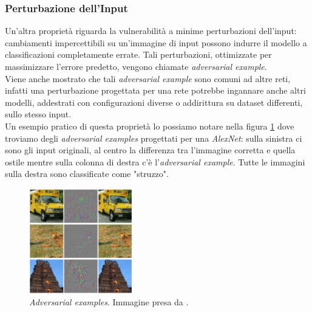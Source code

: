 \subsubsection{Perturbazione dell'Input}
Un'altra propriet\`a riguarda la vulnerabilit\`a a minime perturbazioni dell'input: cambiamenti impercettibili su un'immagine di input possono indurre il modello a classificazioni completamente errate. Tali perturbazioni, ottimizzate per massimizzare l'errore predetto, vengono chiamate \emph{adversarial example}.\\
Viene anche mostrato che tali \emph{adversarial example} sono comuni ad altre reti, infatti una perturbazione progettata per una rete potrebbe ingannare anche altri modelli, addestrati con configurazioni diverse o addirittura su dataset differenti, sullo stesso input.\\
Un esempio pratico di questa propriet\`a lo possiamo notare nella figura \ref{fig:intriguing_adv_example} dove troviamo degli \emph{adversarial examples} progettati per una \emph{AlexNet}: sulla sinistra ci sono gli input originali, al centro la differenza tra l'immagine corretta e quella ostile mentre sulla colonna di destra c'\`e l'\emph{adversarial example}. Tutte le immagini sulla destra sono classificate come "struzzo".

\begin{figure}[H]
    \centering
    \includegraphics[width=0.4\textwidth]{media/2-fooling/adversarial_examples_intruguing13.png}
    \caption{\emph{Adversarial examples}. Immagine presa da \cite{intriguing13}.}
    \label{fig:intriguing_adv_example}
\end{figure}
